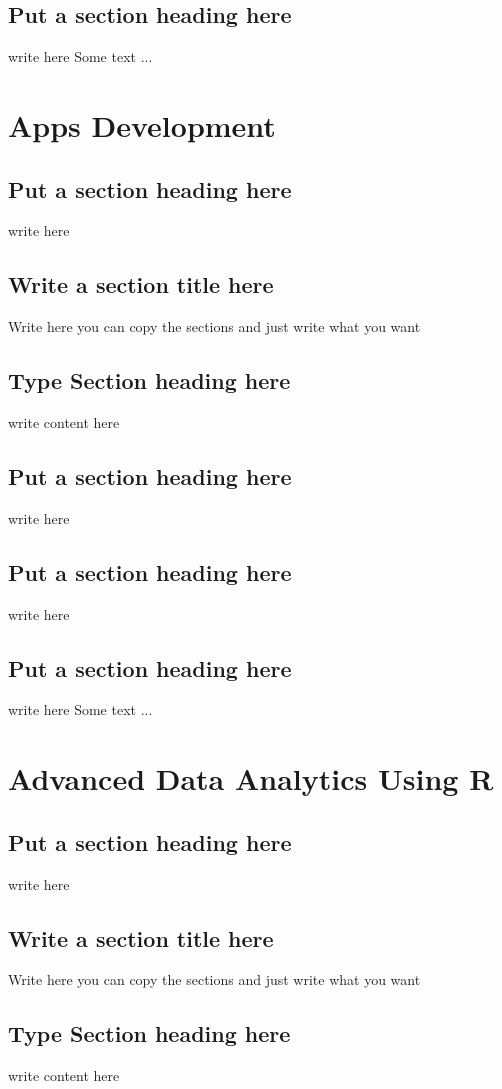 \documentclass[a4paper,twoside]{scrbook}
\begin{document}
\section{Put a section heading here}
write here
Some text ...
\chapter{Apps Development}\label{ch15}
\section{Put a section heading here}
write here
\section{Write a section title here}
Write here you can copy the sections and just write what you want
\section{Type Section heading here}
write content here
\section{Put a section heading here}
write here
\section{Put a section heading here}
write here
\section{Put a section heading here}
write here
Some text ...
\chapter{Advanced Data Analytics Using R}\label{ch16}
\section{Put a section heading here}
write here
\section{Write a section title here}
Write here you can copy the sections and just write what you want
\section{Type Section heading here}
write content here
\end{document}
